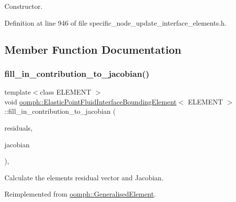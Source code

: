 Constructor. 



Definition at line 946 of file specific\+\_\+node\+\_\+update\+\_\+interface\+\_\+elements.\+h.



\subsection{Member Function Documentation}
\mbox{\label{classoomph_1_1ElasticPointFluidInterfaceBoundingElement_a87802dab899430374a926d1e1bf3d90b}} 
\subsubsection{\texorpdfstring{fill\+\_\+in\+\_\+contribution\+\_\+to\+\_\+jacobian()}{fill\_in\_contribution\_to\_jacobian()}}
{\footnotesize\ttfamily template$<$class E\+L\+E\+M\+E\+NT $>$ \\
void \hyperlink{classoomph_1_1ElasticPointFluidInterfaceBoundingElement}{oomph\+::\+Elastic\+Point\+Fluid\+Interface\+Bounding\+Element}$<$ E\+L\+E\+M\+E\+NT $>$\+::fill\+\_\+in\+\_\+contribution\+\_\+to\+\_\+jacobian (\begin{DoxyParamCaption}\item[{\hyperlink{classoomph_1_1Vector}{Vector}$<$ double $>$ \&}]{residuals,  }\item[{\hyperlink{classoomph_1_1DenseMatrix}{Dense\+Matrix}$<$ double $>$ \&}]{jacobian }\end{DoxyParamCaption})\hspace{0.3cm}{\ttfamily [inline]}, {\ttfamily [virtual]}}



Calculate the element\textquotesingle{}s residual vector and Jacobian. 



Reimplemented from \hyperlink{classoomph_1_1GeneralisedElement_a6ae09fc0d68e4309ac1b03583d252845}{oomph\+::\+Generalised\+Element}.



